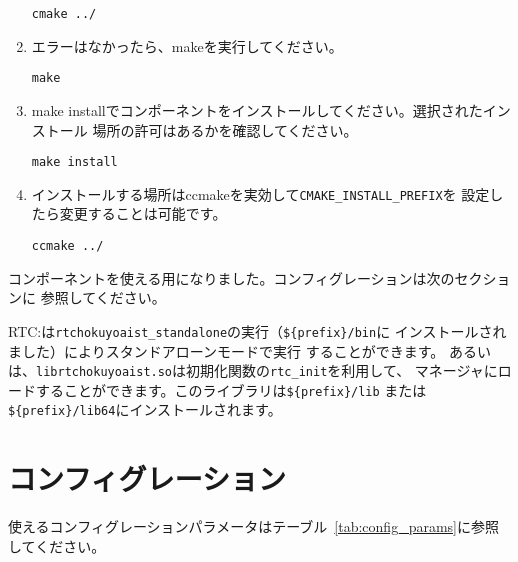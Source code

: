 \documentclass[a4paper,10pt]{article}
\newenvironment{Japanese}{%
  \CJKfamily{min}%
  \CJKtilde
  \CJKnospace}{}
\begin{document}
\begin{CJK}{UTF8}{}
\begin{Japanese}
\begin{enumerate}
  \verb|cmake ../|
  \item エラーはなかったら、makeを実行してください。

  \verb|make|
  \item make
  installでコンポーネントをインストールしてください。選択されたインストール
  場所の許可はあるかを確認してください。

  \verb|make install|
  \item
  インストールする場所はccmakeを実効して\verb|CMAKE_INSTALL_PREFIX|を
  設定したら変更することは可能です。

  \verb|ccmake ../|
\end{enumerate}

コンポーネントを使える用になりました。コンフィグレーションは次のセクションに
参照してください。

RTC:は\verb|rtchokuyoaist_standalone|の実行（\verb|${prefix}/bin|に
インストールされました）によりスタンドアローンモードで実行 することができます。
あるいは、\verb|librtchokuyoaist.so|は初期化関数の\verb|rtc_init|を利用して、
マネージャにロードすることができます。このライブラリは\verb|${prefix}/lib|
または\verb|${prefix}/lib64|にインストールされます。

\section{コンフィグレーション}
\label{sec:configuration}

使えるコンフィグレーションパラメータはテーブル~\ref{tab:config_params}に参照
してください。


\end{Japanese}
\end{CJK}
\end{document}

